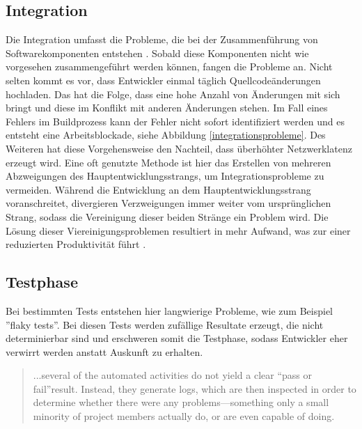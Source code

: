 \subsection{Integration} \label{Integration}
Die Integration umfasst die Probleme, die bei der Zusammenführung von Softwarekomponenten entstehen \cite{LianpingEtPaddy.2015}. Sobald diese Komponenten nicht wie vorgesehen zusammengeführt werden können, fangen die Probleme an. Nicht selten kommt es vor, dass Entwickler einmal täglich Quellcodeänderungen hochladen. Das hat die Folge, dass eine hohe Anzahl von Änderungen mit sich bringt und diese im Konflikt mit anderen Änderungen stehen. Im Fall eines Fehlers im Buildprozess kann der Fehler nicht sofort identifiziert werden und es entsteht eine Arbeitsblockade, siehe Abbildung \ref{integrationsprobleme}. Des Weiteren hat diese Vorgehensweise den Nachteil, dass überhöhter Netzwerklatenz erzeugt wird. Eine oft genutzte Methode ist hier das Erstellen von mehreren Abzweigungen des Hauptentwicklungsstrangs, um Integrationsprobleme zu vermeiden. Während die Entwicklung an dem Hauptentwicklungsstrang voranschreitet, divergieren Verzweigungen immer weiter vom ursprünglichen Strang, sodass die Vereinigung dieser beiden Stränge ein Problem wird. Die Lösung dieser Viereinigungsproblemen resultiert in mehr Aufwand, was zur einer reduzierten Produktivität führt \cite{Laukkanen.2017}. 

\subsection{Testphase}

Bei bestimmten Tests entstehen hier langwierige Probleme, wie zum Beispiel ''flaky tests''. Bei diesen Tests werden zufällige Resultate erzeugt, die nicht determinierbar sind und erschweren somit die Testphase, sodass Entwickler eher verwirrt werden anstatt Auskunft zu erhalten. 

\begin{quote}\glqq ...several of the automated activities do not yield a clear “pass or fail”result. Instead, they generate logs, which are then inspected in order to determine whether there were any problems—something only a small minority of project members actually do, or are even capable of doing. \grqq~\cite[S.65]{Laukkanen.2017}\end{quote}
%

